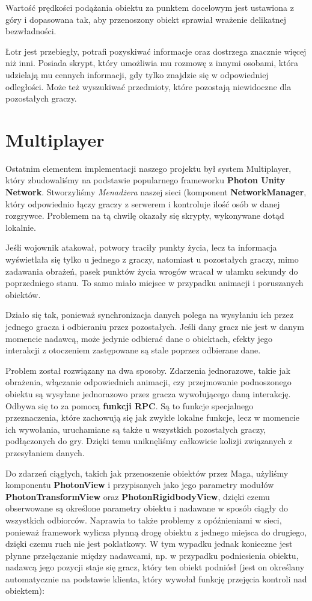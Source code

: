 \documentclass[openright]{xmgr}
\newcommand{\name}[1]{\textbf{\textcolor{NavyBlue}{#1}}}
\begin{document}
    Wartość prędkości podążania obiektu za punktem docelowym jest ustawiona z góry i dopasowana tak, aby przenoszony obiekt sprawiał wrażenie delikatnej bezwładności.


    Łotr jest przebiegły, potrafi pozyskiwać informacje oraz dostrzega znacznie więcej niż inni. Posiada skrypt, który umożliwia mu rozmowę z innymi osobami, która udzielają mu cennych informacji, gdy tylko znajdzie się w odpowiedniej odległości. Może też wyszukiwać przedmioty, które pozostają niewidoczne dla pozostałych graczy.

  \section{Multiplayer}

      Ostatnim elementem implementacji naszego projektu był system Multiplayer, który zbudowaliśmy na podstawie popularnego frameworku \name{Photon Unity Network}. Stworzyliśmy \textit{Menadżera} naszej sieci (komponent \name{NetworkManager}, który odpowiednio łączy graczy z serwerem i kontroluje ilość osób w danej rozgrywce. Problemem na tą chwilę okazały się skrypty, wykonywane dotąd lokalnie.

      Jeśli wojownik atakował, potwory traciły punkty życia, lecz ta informacja wyświetlała się tylko u jednego z graczy, natomiast u pozostałych graczy, mimo zadawania obrażeń, pasek punktów życia wrogów wracał w ułamku sekundy do poprzedniego stanu. To samo miało miejsce w przypadku animacji i poruszanych obiektów.

      Działo się tak, ponieważ synchronizacja danych polega na wysyłaniu ich przez jednego gracza i odbieraniu przez pozostałych. Jeśli dany gracz nie jest w danym momencie nadawcą, może jedynie odbierać dane o obiektach, efekty jego interakcji z otoczeniem zastępowane są stale poprzez odbierane dane.

      Problem został rozwiązany na dwa sposoby. Zdarzenia jednorazowe, takie jak obrażenia, włączanie odpowiednich animacji, czy przejmowanie podnoszonego obiektu są wysyłane jednorazowo przez gracza wywołującego daną interakcję. Odbywa się to za pomocą \name{funkcji RPC}. Są to funkcje specjalnego przeznaczenia, które zachowują się jak zwykłe lokalne funkcje, lecz w momencie ich wywołania, uruchamiane są także u wszystkich pozostałych graczy, podłączonych do gry. Dzięki temu uniknęliśmy całkowicie kolizji związanych z przesyłaniem danych.

      Do zdarzeń ciągłych, takich jak przenoszenie obiektów przez Maga, użyliśmy komponentu \name{PhotonView} i przypisanych jako jego parametry modułów \name{PhotonTransformView} oraz \name{PhotonRigidbodyView}, dzięki czemu obserwowane są określone parametry obiektu i nadawane w sposób ciągły do wszystkich odbiorców. Naprawia to także problemy z opóźnieniami w sieci, ponieważ framework wylicza płynną drogę obiektu z jednego miejsca do drugiego, dzięki czemu ruch nie jest poklatkowy. W tym wypadku jednak konieczne jest płynne przełączanie między nadawcami, np. w przypadku podniesienia obiektu, nadawcą jego pozycji staje się gracz, który ten obiekt podniósł (jest on określany automatycznie na podstawie klienta, który wywołał funkcję przejęcia kontroli nad obiektem):
\end{document}
